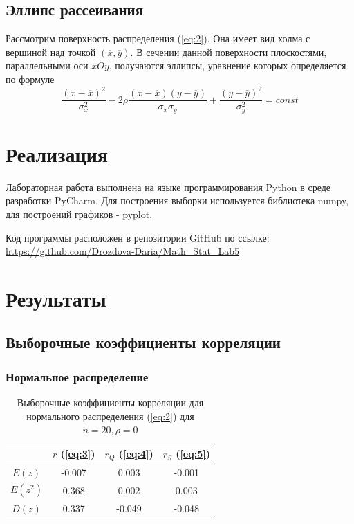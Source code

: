 \documentclass{article}
\begin{document}
\subsection{Эллипс рассеивания}

Рассмотрим поверхность распределения (\ref{eq:2}). Она имеет вид холма с вершиной над точкой $(\overline{x}, \overline{y})$. В сечении данной поверхности плоскостями, параллельными оси $xOy$, получаются эллипсы, уравнение которых определяется по формуле
\begin{equation}
\frac{(x - \overline{x})^2}{\sigma_x^2} - 2 \rho \frac{(x - \overline{x})(y - \overline{y})}{\sigma_x \sigma_y} + \frac{(y - \overline{y})^2}{\sigma_y^2} = const
\label{eq:6}
\end{equation}

\newpage
\section{Реализация}

Лабораторная работа выполнена на языке программирования Python в среде разработки PyCharm. Для построения выборки используется библиотека numpy, для построений графиков - pyplot.

Код программы расположен в репозитории GitHub по ссылке: \url{https://github.com/Drozdova-Daria/Math_Stat_Lab5}

\newpage
\section{Результаты}

\subsection{Выборочные коэффициенты корреляции}

\subsubsection{Нормальное распределение} \label{sec:1}

\begin{table} [hb]
\begin{center}
\begin{tabular}{|c|c|c|c|}
\hline 
 & $r$ (\ref{eq:3}) & $r_Q$ (\ref{eq:4}) & $r_S$ (\ref{eq:5}) \\ 
\hline 
$E(z)$ & -0.007 & 0.003 & -0.001 \\ 
\hline 
$E(z^2)$ & 0.368 & 0.002 & 0.003 \\ 
\hline 
$D(z)$ & 0.337 & -0.049 & -0.048 \\ 
\hline 
\end{tabular} 
\caption{Выборочные коэффициенты корреляции для нормального распределения (\ref{eq:2}) для $n = 20, \rho = 0$}
\end{center}
\end{table}
\end{document}
